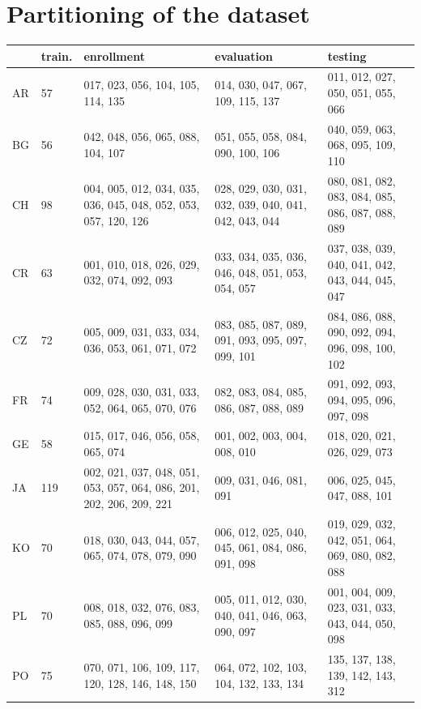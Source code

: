 \documentclass[bsc,frontabs,twoside,singlespacing,parskip,deptreport]{infthesis}
\begin{document}
\chapter{Partitioning of the dataset}{
  \begin{sc}
    \centering
    \footnotesize
    \begin{longtable}{p{0.5cm}|p{0.8cm}|p{3.9cm}|p{3.5cm}|p{3.5cm}}
      & train. & enrollment & evaluation & testing \\
      \hline
      AR & 57 & 017, 023, 056, 104, 105, 114, 135 & 014, 030, 047, 067, 109, 115, 137 & 011, 012, 027, 050, 051, 055, 066 \\
      \hline
      BG & 56 & 042, 048, 056, 065, 088, 104, 107 & 051, 055, 058, 084, 090, 100, 106 & 040, 059, 063, 068, 095, 109, 110 \\
      \hline
      CH & 98 & 004, 005, 012, 034, 035, 036, 045, 048, 052, 053, 057, 120, 126 & 028, 029, 030, 031, 032, 039, 040, 041, 042, 043, 044 & 080, 081, 082, 083, 084, 085, 086, 087, 088, 089 \\
      \hline
      CR & 63 & 001, 010, 018, 026, 029, 032, 074, 092, 093 & 033, 034, 035, 036, 046, 048, 051, 053, 054, 057 & 037, 038, 039, 040, 041, 042, 043, 044, 045, 047 \\
      \hline
      CZ & 72 & 005, 009, 031, 033, 034, 036, 053, 061, 071, 072 & 083, 085, 087, 089, 091, 093, 095, 097, 099, 101 & 084, 086, 088, 090, 092, 094, 096, 098, 100, 102 \\
      \hline
      FR & 74 & 009, 028, 030, 031, 033, 052, 064, 065, 070, 076 & 082, 083, 084, 085, 086, 087, 088, 089 & 091, 092, 093, 094, 095, 096, 097, 098 \\
      \hline
      GE & 58 & 015, 017, 046, 056, 058, 065, 074 & 001, 002, 003, 004, 008, 010 & 018, 020, 021, 026, 029, 073 \\
      \hline
      JA & 119 & 002, 021, 037, 048, 051, 053, 057, 064, 086, 201, 202, 206, 209, 221 & 009, 031, 046, 081, 091 & 006, 025, 045, 047, 088, 101 \\
      \hline
      KO & 70 & 018, 030, 043, 044, 057, 065, 074, 078, 079, 090 & 006, 012, 025, 040, 045, 061, 084, 086, 091, 098 & 019, 029, 032, 042, 051, 064, 069, 080, 082, 088 \\
      \hline
      PL & 70 & 008, 018, 032, 076, 083, 085, 088, 096, 099 & 005, 011, 012, 030, 040, 041, 046, 063, 090, 097 & 001, 004, 009, 023, 031, 033, 043, 044, 050, 098 \\
      \hline
      PO & 75 & 070, 071, 106, 109, 117, 120, 128, 146, 148, 150 & 064, 072, 102, 103, 104, 132, 133, 134 & 135, 137, 138, 139, 142, 143, 312 \\

\end{longtable}
\end{sc}}
\end{document}
